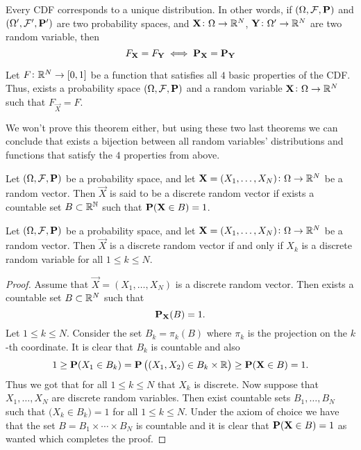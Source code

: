 \documentclass[11pt,a4paper]{article}
\begin{document}
  \begin{theorem}
    Every CDF corresponds to a unique distribution. In other words, if
    $(\Omega, \mathcal F, \mathbf{P})$ and $(\Omega', \mathcal F', \mathbf{P}')$
    are two probability spaces, and $\boldsymbol{\mathbf{X}} \colon \Omega \to \mathbb{R}^N$,
    $\boldsymbol{\mathbf{Y}} \colon \Omega' \to \mathbb{R}^N$ are two random variable, then
    \[
      F_{\boldsymbol{\mathbf{X}}} = F_{\boldsymbol{\mathbf{Y}}} \iff 
      \mathbf{P}_{\boldsymbol{\mathbf{X}}} = \mathbf{P}_{\boldsymbol{\mathbf{Y}}}
    \]
  \end{theorem}
  \begin{theorem}
    Let $F \colon \mathbb{R}^N \to [0,1]$ be a function that satisfies all $4$ basic
    properties of the CDF. Thus, exists a probability space 
    $(\Omega, \mathcal F, \mathbf{P})$ and a random variable 
    $\boldsymbol{\mathbf{X}} \colon \Omega \to \mathbb{R}^N$ such that $F_{\vec{X}} = F$.
  \end{theorem}
  We won't prove this theorem either, but using these two last theorems
  we can conclude that exists a bijection between all random variables'
  distributions and functions that satisfy the $4$ properties from above.

  \begin{definition}
    Let $(\Omega, \mathcal F, \mathbf{P})$ be a probability space, 
    and let $\boldsymbol{\mathbf{X}} = (X_1,\dots,X_N) \colon \Omega \to \mathbb{R}^N$ be a random vector.
    Then $\vec{X}$ is said to be a discrete random vector if exists a countable
    set $B \subset \mathbb{R}^{\mathbb{N}}$ such that $\mathbf{P}(\boldsymbol{\mathbf{X}} \in B) = 1$.
  \end{definition}

  \begin{proposition}
    Let $(\Omega, \mathcal F, \mathbf{P})$ be a probability space, 
    and let $\boldsymbol{\mathbf{X}} = (X_1,\dots,X_N) \colon \Omega \to \mathbb{R}^N$ be a random vector.
    Then $\vec{X}$ is a discrete random vector if and only if $X_k$ is a discrete
    random variable for all $1 \le k \le N$.
  \end{proposition}
  \begin{proof}
    Assume that $\vec{X} = (X_1,\dots,X_N)$ is a discrete random vector.
    Then exists a countable set $B \subset \mathbb{R}^N$ such that
    \[
      \mathbf{P}_{\boldsymbol{\mathbf{X}}}(B) = 1.
    \]
    Let $1 \le k \le N$. Consider the set $B_k = \pi_k(B)$ where $\pi_k$ is the
    projection on the $k$-th coordinate. It is clear that $B_k$ is countable
    and also
    \[
      1 \geq
      \mathbf{P}(X_1 \in B_k) =
      \mathbf{P}\left((X_1,X_2) \in B_k \times \mathbb{R}\right) \geq
      \mathbf{P}(\boldsymbol{\mathbf{X}} \in B) =
      1.
    \]
    Thus we got that for all $1 \le k \le N$ that $X_k$ is discrete.
    Now suppose that $X_1,\dots,X_N$ are discrete random variables.
    Then exist countable sets $B_1,\dots,B_N$ such that 
    $\mathbf (X_k \in B_k) = 1$ for all $1 \le k \le N$.
    Under the axiom of choice we have that the set 
    $B = B_1 \times \cdots \times B_N$ is countable and it is clear that
    $\mathbf{P}(\boldsymbol{\mathbf{X}} \in B) = 1$ as wanted which completes the proof.
  \end{proof}
  
\end{document}
